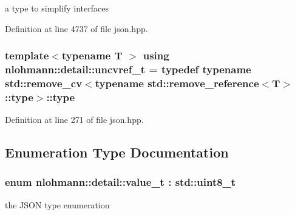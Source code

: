 a type to simplify interfaces 



Definition at line 4737 of file json.\+hpp.

\subsubsection[{\texorpdfstring{uncvref\+\_\+t}{uncvref_t}}]{\setlength{\rightskip}{0pt plus 5cm}template$<$typename T $>$ using {\bf nlohmann\+::detail\+::uncvref\+\_\+t} = typedef typename std\+::remove\+\_\+cv$<$typename std\+::remove\+\_\+reference$<$T$>$\+::type$>$\+::type}\hypertarget{namespacenlohmann_1_1detail_a53a082eedad9f4729fcd8fed552a21f7}{}\label{namespacenlohmann_1_1detail_a53a082eedad9f4729fcd8fed552a21f7}


Definition at line 271 of file json.\+hpp.



\subsection{Enumeration Type Documentation}
\subsubsection[{\texorpdfstring{value\+\_\+t}{value_t}}]{\setlength{\rightskip}{0pt plus 5cm}enum {\bf nlohmann\+::detail\+::value\+\_\+t} \+: std\+::uint8\+\_\+t\hspace{0.3cm}{\ttfamily [strong]}}\hypertarget{namespacenlohmann_1_1detail_a1ed8fc6239da25abcaf681d30ace4985}{}\label{namespacenlohmann_1_1detail_a1ed8fc6239da25abcaf681d30ace4985}


the J\+S\+ON type enumeration 

